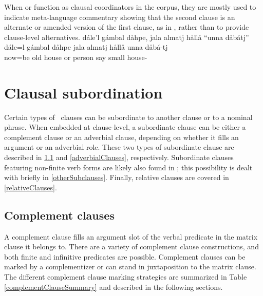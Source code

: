When  or  function as clausal coordinators in the corpus, 
they are mostly used to indicate meta-language commentary showing that the second clause is an alternate or amended version of the first clause, as in , rather than to provide clause-level alternatives.
\ea\label{ORcoordination1}%
\glll	dále’l gámbal dåhpe, jala almatj hållå “unna dåbátj”\\
	dále=l gámbal dåhpe jala almatj hållå unna dåbá-tj\\
	now=be\BS{} old house\BS{} or person\BS{} say\BS{} small house-\BS{}\\\nopagebreak
{} %
\z


\section{Clausal subordination}\label{clausalSubordination}
Certain types of \PS\ clauses can be subordinate to another clause or to a nominal phrase. %
When embedded at clause-level, a subordinate clause can be either a complement clause or an adverbial clause, depending on whether it fills an argument or an adverbial role. 
These two types of subordinate clause are described in \SEC\ref{complementClauses} and \SEC\ref{adverbialClauses}, respectively. 
Subordinate clauses featuring non-finite verb forms are likely also found in \PS; this possibility is dealt with briefly in \SEC\ref{otherSubclauses}. 
Finally, relative clauses are covered in \SEC\ref{relativeClauses}.

\subsection{Complement clauses}\label{complementClauses}
A complement clause fills an argument slot of the verbal predicate in the matrix clause it belongs to. 
There are a variety of complement clause constructions, and both finite and infinitive predicates are possible. Complement clauses can be marked by a complementizer %
or can stand in juxtaposition to the matrix clause. %
The different complement clause marking strategies are summarized in Table \vref{complementClauseSummary} and described in the following sections.

